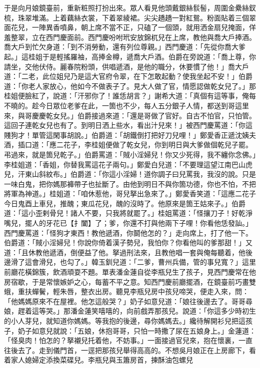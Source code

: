 于是向月娘鏡臺前，重新粧照打扮出來。眾人看見他頭戴銀絲䯼髻，周圍金纍絲釵梳，珠翠堆滿。上着藕絲衣裳，下着翠綾裙。尖尖趫趫一對紅鴛。粉面貼着三個翠面花兒，一陣異香噴鼻，朝上席不當不正，只磕了一個頭，就用洒金扇兒掩面，佯羞整翠，立在西門慶面前。西門慶吩咐玳安放錦杌兒在上席，教他與喬大戶捧酒。喬大戶到忙欠身道：「到不消勞動，還有列位尊親。」西門慶道：「先從你喬大爹起。」這桂姐于是輕搖羅袖，高捧金樽，遞喬大戶酒。伯爵在旁說道：「喬上尊，你請坐，交他伏侍。麗春院粉頭，供唱遞酒，是他的職分，休要慣了他！」喬大戶道：「二老，此位姐兒乃是這大官府令翠，在下怎敢起動？使我坐起不安！」伯爵道：「你老人家放心，他如今不做表子了。見大人做了官，情愿認做乾女兒了。」那桂姐便臉紅了，說道：「汗邪你了！誰恁胡言？」謝希大道：「真個有這等事，俺每不曉的。趁今日眾位老爹在此，一箇也不少，每人五分銀子人情，都送到哥這里來，與哥慶慶乾女兒。」伯爵接過來道：「還是哥做了官好。自古不怕官，只怕管。這回子連乾女兒也有了。到明日洒上些水，看出汁兒來！」被西門慶罵道：「你這賤狗才！單管這閑事胡說。」伯爵道：「胡鐵倒打把好刀兒哩！」鄭愛香正遞沈姨夫酒，插口道：「應二花子，李桂姐便做了乾女兒，你到明日與大爹做個乾兒子罷。弔過來，就是箇兒乾子。」伯爵罵道：「賊小淫婦兒！你又少死得，我不纏你念佛。」李桂姐道：「香姐，你替我罵這花子兩句。」鄭愛白兒道：「不要理這望江南巴山虎兒，汗東山斜紋布。」伯爵道：「你這小淫婦！道你調子曰兒罵我，我沒的說。只是一味白鬼，把你媽那褲帶子也扯斷了。由他到明日不與你箇功德，你也不怕，不把將軍為神道。」桂姐道：「咱休惹他，哥兒拏出急來了。」鄭愛香笑道：「這應二花子今日鬼酉上車兒，推醜；東瓜花兒，醜的沒時了。他原來是箇王姑來子。」伯爵道：「這小歪剌骨兒！諸人不要，只我將就罷了。」桂姐罵道：「怪攘刀子！好乾淨嘴兒，擺人的牙花已【扌闔】了；爹，你還不打與他兩下子哩！你看他恁發訕。」西門慶罵道：「怪狗才東西！教他遞酒，你鬬他怎的？」走向席上，打了他一下。伯爵道：「賊小淫婦兒！你說你倚着漢子勢兒，我怕你？你看他叫的爹那甜！」又道：「且休教他遞酒，倒便益了他。拏過刑法來，且教他唱一套與俺每聽着，他後邊滑了這會滑兒，也勾了。」韓玉釧兒道：「二爹，曹州兵備，管的事兒寬？」這里前廳花橫錦簇，飲酒頑耍不題。單表潘金蓮自從李瓶兒生了孩子，見西門慶常在他房宿歇，于是常懷嫉妒之心，每蓄不平之意。知西門慶前廳擺酒，在鏡臺前巧畫雙蛾，重扶蟬鬢，輕朱唇，整衣出房。聽見李瓶兒房中孩兒啼哭，便走入來，問：「他媽媽原來不在屋裡。他怎這般哭？」奶子如意兒道：「娘往後邊去了。哥哥尋娘，趕着這等哭。」那潘金蓮笑嘻嘻的，向前戲弄那孩兒。說道：「你這多少時初生的小人芽兒，就知道你媽媽。等我抱的後邊，尋你媽媽去。」纔待解開衫兒把這孩子，奶子如意兒就說：「五娘，休抱哥哥，只怕一時撒了尿在五娘身上。」金蓮道：「怪臭肉！怕怎的？拏襯兒托着他，不妨事。」一面接過官兒來，抱在懷裏，一直往後去了。走到儀門首，一逕把那孩兒舉得高高的。不想吳月娘正在上房廊下，看着家人媳婦定添換菜碟兒。李瓶兒與玉簫房首，揀酥油包螺兒 